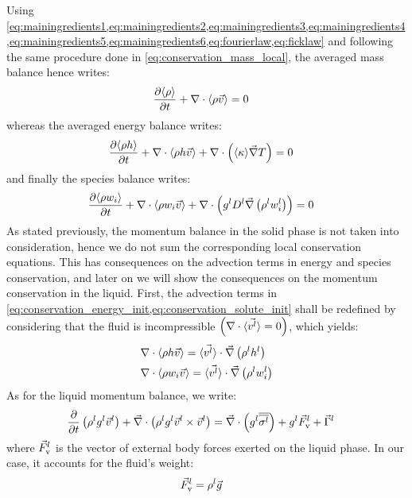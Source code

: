 Using \cref{eq:mainingredients1,eq:mainingredients2,eq:mainingredients3,eq:mainingredients4,eq:mainingredients5,eq:mainingredients6,eq:fourierlaw,eq:ficklaw}
and following the same procedure done in \cref{eq:conservation_mass_local}, the averaged mass balance hence writes:
\begin{align}
\label{eq:conservation_mass}
& \frac{\partial \langle \rho \rangle}{\partial t} + \nabla \cdot \langle \rho \vec{v} \rangle = 0
\end{align}
whereas the averaged energy balance writes:
\begin{align}
\label{eq:conservation_energy_init}
& \frac{\partial \langle \rho h \rangle}{\partial t} + \nabla \cdot \langle \rho h \vec{v} \rangle + \nabla \cdot \left( \langle \kappa \rangle \vec{\nabla} T \right) = 0
\end{align}
and finally the species balance writes:
\begin{align}
\label{eq:conservation_solute_init}
& \frac{\partial \langle \rho w_i \rangle}{\partial t} + \nabla \cdot \langle \rho w_i \vec{v} \rangle + \nabla \cdot \left( {g^l} D^l \vec{\nabla} \left( \rho^l w_i^l \right) \right)= 0
\end{align}
As stated previously, the momentum balance in the solid phase is not taken into consideration, hence we do not sum the corresponding 
local conservation equations. This has consequences on the advection terms in energy and species conservation, and later on we will show
the consequences on the momentum conservation in the liquid. First, the advection terms in \cref{eq:conservation_energy_init,eq:conservation_solute_init}
shall be redefined by considering that the fluid is incompressible $\left( \nabla \cdot \langle \vec{v^l} \rangle = 0 \right)$, which yields:
\begin{align}
\label{eq:advection_no_solid}
& \nabla \cdot \langle \rho h \vec{v} \rangle = \langle \vec{v^l} \rangle \cdot \vec{\nabla} \left( \rho^l h^l \right) \\
& \nabla \cdot \langle \rho w_i \vec{v} \rangle = \langle \vec{v^l} \rangle \cdot \vec{\nabla} \left( \rho^l w_i^l \right)
\end{align}
As for the liquid momentum balance, we write:
\begin{align}
\label{eq:conservation_momentumliq_init}
& \frac{\partial}{\partial t} \left(  \rho^l {g^l} \vec{v}^l  \right)  + \vec{\nabla} \cdot \left( \rho^l {g^l} \vec{v}^l \times \vec{v}^l \right) = 
	\vec{\nabla} \cdot \left( {g^l} {\overline{\overline{\sigma^l}}} \right) +{g^l} \vec{F}_{\text{v}}^l + \vec{\Gamma}^{l}
\end{align}
where $\vec{F}_{\text{v}}^l$ is the vector of external body forces exerted on the liquid phase. In our case, it accounts for the fluid's weight:
\begin{align}
\label{eq:fluid_weight}
& \vec{F}_{\text{v}}^l = \rho^l \vec{g}
\end{align}
